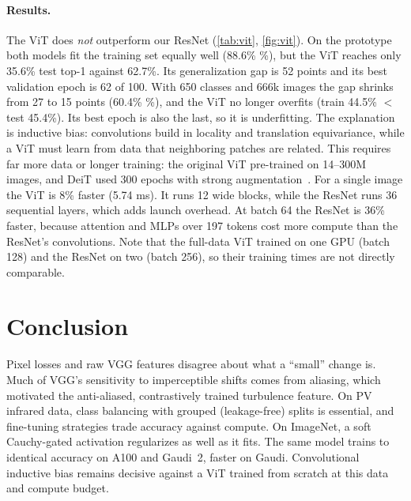 \documentclass[10pt,twocolumn,letterpaper]{article}
\begin{document}
\paragraph{Results.}
The ViT does \emph{not} outperform our ResNet (\cref{tab:vit}, \cref{fig:vit}). On the prototype both models fit the training set equally well (88.6\% \%), but the ViT reaches only 35.6\% test top-1 against 62.7\%. Its generalization gap is 52 points and its best validation epoch is 62 of 100. With 650 classes and 666k images the gap shrinks from 27 to 15 points (60.4\% \%), and the ViT no longer overfits (train 44.5\% $<$ test 45.4\%). Its best epoch is also the last, so it is underfitting. The explanation is inductive bias: convolutions build in locality and translation equivariance, while a ViT must learn from data that neighboring patches are related. This requires far more data or longer training: the original ViT pre-trained on 14--300M images, and DeiT used 300 epochs with strong augmentation~\cite{dosovitskiy2021vit,touvron2021deit}.
For a single image the ViT is 8\% faster (5.74  ms). It runs 12 wide blocks, while the ResNet runs 36 sequential layers, which adds launch overhead. At batch 64 the ResNet is 36\% faster, because attention and MLPs over 197 tokens cost more compute than the ResNet's convolutions. Note that the full-data ViT trained on one GPU (batch 128) and the ResNet on two (batch 256), so their training times are not directly comparable.


\section{Conclusion}
Pixel losses and raw VGG features disagree about what a ``small'' change is. Much of VGG's sensitivity to imperceptible shifts comes from aliasing, which motivated the anti-aliased, contrastively trained turbulence feature. On PV infrared data, class balancing with grouped (leakage-free) splits is essential, and fine-tuning strategies trade accuracy against compute. On ImageNet, a soft Cauchy-gated activation regularizes as well as it fits. The same model trains to identical accuracy on A100 and Gaudi~2, faster on Gaudi. Convolutional inductive bias remains decisive against a ViT trained from scratch at this data and compute budget.
\end{document}

